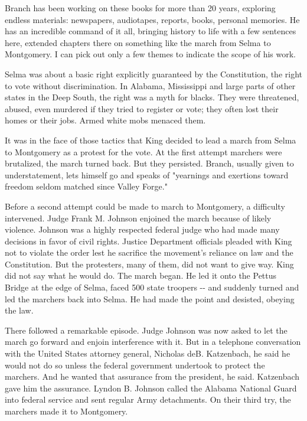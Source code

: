 Branch has been working on these books for more than 20 years, exploring
endless materials: newspapers, audiotapes, reports, books, personal
memories. He has an incredible command of it all, bringing history to
life with a few sentences here, extended chapters there on something
like the march from Selma to Montgomery. I can pick out only a few
themes to indicate the scope of his work.

Selma was about a basic right explicitly guaranteed by the Constitution,
the right to vote without discrimination. In Alabama, Mississippi and
large parts of other states in the Deep South, the right was a myth for
blacks. They were threatened, abused, even murdered if they tried to
register or vote; they often lost their homes or their jobs. Armed white
mobs menaced them.

It was in the face of those tactics that King decided to lead a march
from Selma to Montgomery as a protest for the vote. At the first attempt
marchers were brutalized, the march turned back. But they persisted.
Branch, usually given to understatement, lets himself go and speaks of
"yearnings and exertions toward freedom seldom matched since Valley
Forge."

Before a second attempt could be made to march to Montgomery, a
difficulty intervened. Judge Frank M. Johnson enjoined the march because
of likely violence. Johnson was a highly respected federal judge who had
made many decisions in favor of civil rights. Justice Department
officials pleaded with King not to violate the order lest he sacrifice
the movement's reliance on law and the Constitution. But the protesters,
many of them, did not want to give way. King did not say what he would
do. The march began. He led it onto the Pettus Bridge at the edge of
Selma, faced 500 state troopers -\/- and suddenly turned and led the
marchers back into Selma. He had made the point and desisted, obeying
the law.

There followed a remarkable episode. Judge Johnson was now asked to let
the march go forward and enjoin interference with it. But in a telephone
conversation with the United States attorney general, Nicholas deB.
Katzenbach, he said he would not do so unless the federal government
undertook to protect the marchers. And he wanted that assurance from the
president, he said. Katzenbach gave him the assurance. Lyndon B. Johnson
called the Alabama National Guard into federal service and sent regular
Army detachments. On their third try, the marchers made it to
Montgomery.

